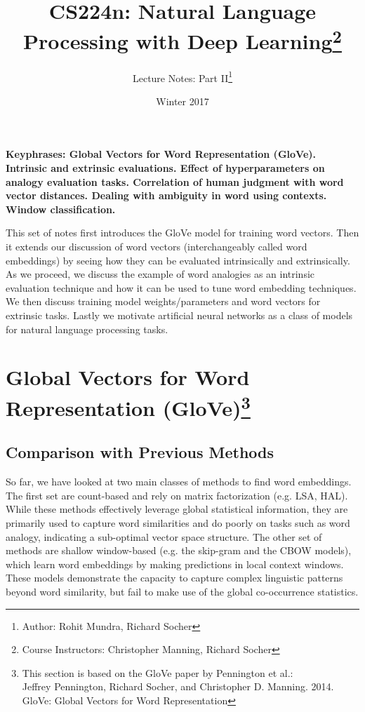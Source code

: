 \documentclass{tufte-handout}
\title{CS224n: Natural Language Processing with Deep Learning\thanks{Course Instructors: Christopher Manning, Richard Socher}}
\author[Rohit Mundra, Richard Socher]{Lecture Notes: Part II\thanks{Author: Rohit Mundra, Richard Socher}}
\date{Winter 2017} %
\begin{document}
\maketitle%



\textbf{Keyphrases: Global Vectors for Word Representation (GloVe). Intrinsic and extrinsic evaluations. Effect of hyperparameters on analogy evaluation tasks. Correlation of human judgment with word vector distances. Dealing with ambiguity in word using contexts. Window classification.}

This set of notes first introduces the GloVe model for training word vectors. Then it extends our discussion of word vectors (interchangeably called word embeddings) by seeing how they can be evaluated intrinsically and extrinsically. As we proceed, we discuss the example of word analogies as an intrinsic evaluation technique and how it can be used to tune word embedding techniques. We then discuss training model weights/parameters and word vectors for extrinsic tasks. Lastly we motivate artificial neural networks as a class of models for natural language processing tasks.

\section[GloVe]{Global Vectors for Word Representation (GloVe)\footnote{This section is based on the GloVe paper by Pennington et al.: \\ Jeffrey Pennington, Richard Socher, and Christopher D. Manning. 2014. GloVe: Global Vectors for Word Representation}}

\subsection{Comparison with Previous Methods}
So far, we have looked at two main classes of methods to find word embeddings. The first set are count-based and rely on matrix factorization (e.g. LSA, HAL). While these methods effectively leverage global statistical information, they are primarily used to capture word similarities and do poorly on tasks such as word analogy, indicating a sub-optimal vector space structure. 
The other set of methods are shallow window-based (e.g. the skip-gram and the CBOW models), which learn word embeddings by making predictions in local context windows. These models demonstrate the capacity to capture complex linguistic patterns beyond word similarity, but fail to make use of the global co-occurrence statistics.
\end{document}
